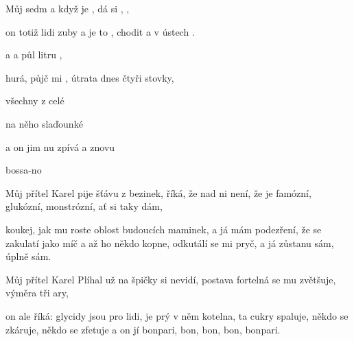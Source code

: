

\zs
Můj   sedm  
a když je , dá si ,
,

on totiž   lidi zuby  
a je to , chodit 
a   v ústech .   
\ks


\zr
{}  a  a půl litru ,

 hurá,  půjč mi , útrata dnes  čtyři stovky,

všechny  z celé 

na něho  slaďounké 

a on jim nu zpívá  a znovu

  bossa-no   
\kr

\zs
Můj přítel Karel pije šťávu z bezinek,
říká, že nad ni není,
že je famózní, glukózní, monstrózní, ať si taky dám,

koukej, jak mu roste oblost budoucích maminek,
a já mám podezření,
že se zakulatí jako míč
a až ho někdo kopne, odkutálí se mi pryč,
a já zůstanu sám, úplně sám.
\ks

\zr  \kr

\zs
Můj přítel Karel Plíhal už na špičky si nevidí,
postava fortelná se mu zvětšuje,
výměra tři ary,

on ale říká: glycidy jsou pro lidi,
je prý v něm kotelna, ta cukry spaluje,
někdo se zkáruje, někdo se zfetuje
a on jí bonpari, bon, bon, bon, bonpari.
\ks

\zr  \kr

\kp





